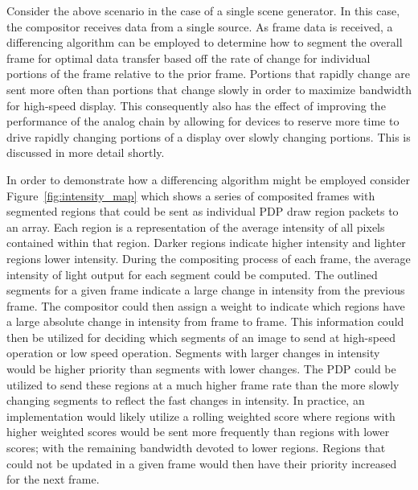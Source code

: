     Consider the above scenario in the case of a single scene generator. In this case, the compositor receives data from a single source. As frame data is received, a differencing algorithm can be employed to determine how to segment the overall frame for optimal data transfer based off the rate of change for individual portions of the frame relative to the prior frame. Portions that rapidly change are sent more often than portions that change slowly in order to maximize bandwidth for high-speed display. This consequently also has the effect of improving the performance of the analog chain by allowing for devices to reserve more time to drive rapidly changing portions of a display over slowly changing portions. This is discussed in more detail shortly.

    In order to demonstrate how a differencing algorithm might be employed consider Figure~\ref{fig:intensity_map} which shows a series of composited frames with segmented regions that could be sent as individual PDP draw region packets to an array. Each region is a representation of the average intensity of all pixels contained within that region. Darker regions indicate higher intensity and lighter regions lower intensity. During the compositing process of each frame, the average intensity of light output for each segment could be computed. The outlined segments for a given frame indicate a large change in intensity from the previous frame. The compositor could then assign a weight to indicate which regions have a large absolute change in intensity from frame to frame. This information could then be utilized for deciding which segments of an image to send at high-speed operation or low speed operation. Segments with larger changes in intensity would be higher priority than segments with lower changes. The PDP could be utilized to send these regions at a much higher frame rate than the more slowly changing segments to reflect the fast changes in intensity. In practice, an implementation would likely utilize a rolling weighted score where regions with higher weighted scores would be sent more frequently than regions with lower scores; with the remaining bandwidth devoted to lower regions. Regions that could not be updated in a given frame would then have their priority increased for the next frame.

